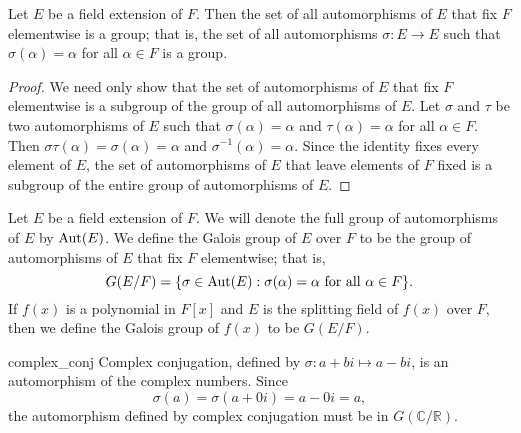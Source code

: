 \begin{proposition}
Let $E$ be a field extension of $F$.  Then the set of all automorphisms of $E$ that fix $F$ elementwise is a group; that is, the set of all automorphisms $\sigma : E \rightarrow E$ such that $\sigma( \alpha ) =
\alpha$ for all $\alpha \in F$ is a group.  
\end{proposition}

\begin{proof}
We need only show that the set of automorphisms of $E$ that fix $F$ elementwise is a subgroup of the group of all automorphisms of $E$.  Let $\sigma$ and $\tau$ be two automorphisms of $E$ such that $\sigma( \alpha ) = \alpha$ and $\tau( \alpha ) = \alpha$ for all $\alpha \in F$.  Then $\sigma \tau( \alpha ) = \sigma( \alpha) = \alpha$ and  $\sigma^{-1}( \alpha ) = \alpha$.   Since the identity fixes every  element of $E$, the set of automorphisms of $E$ that leave elements of  $F$ fixed is a subgroup of the entire group of automorphisms of $E$. 
\end{proof}

\medskip

Let $E$ be a field extension of $F$.  We will denote the full group of automorphisms of $E$ by $\operatorname{Aut}(E)$.  We define the {\bfi Galois group\/} of $E$ over $F$ to be
the group of automorphisms of $E$ that fix $F$ elementwise; that is,
\[
G(E/F)\label{notegalois} = \{ \sigma \in \operatorname{Aut}(E) : \sigma(\alpha)
=
\alpha \mbox{ for all $\alpha \in F$} \}.
\] 
If $f(x)$ is a polynomial in $F[x]$ and $E$ is the splitting field of $f(x)$ over $F$, then we define the Galois group of $f(x)$ to be $G(E/F)$. 


\begin{example}{complex_conj}
Complex conjugation, defined by $\sigma : a + bi \mapsto a - bi$, is an automorphism of the complex numbers.  Since 
\[
\sigma(a) = \sigma(a + 0i) = a - 0i = a,
\]
the automorphism defined by complex conjugation must be in $G( {\mathbb C} / {\mathbb R} )$. 
\end{example}


